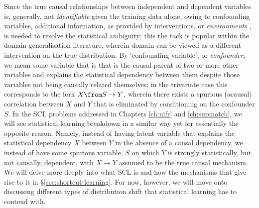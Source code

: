 Since the true causal relationships between independent and dependent variables is, generally, not
\emph{identifiable} given the training data alone, owing to confounding variables, additional
information, as provided by interventions, or \emph{environments} \citep{peters2016causal}, is
needed to resolve the statistical ambiguity; this  the tack is popular within the domain
generalisation literature, wherein domain can be viewed as a different intervention on the true
distribution.
%
By `confounding variable', or \emph{confounder}, we mean some variable that is that is the causal
parent of two or more other variables and explains the statistical dependency between them despite
those variables not being causally related themselves; in the trivariate case this corresponds to
the fork \(X \from S \to Y \), wherein there exists a spurious (acausal) correlation between \(X\)
and \(Y\) that is eliminated by conditioning on the confounder \(S\).
%
In the \ac{SCL} problems addressed in Chapters \ref{ch:nifr} and \ref{ch:supmatch}, we will see
statistical learning breakdown in a similar way yet for essentially the opposite reason.
%
Namely, instead of having latent variable that explains the statistical dependency \(X\) between
\(Y\) in the absence of a causal dependency, we instead of have some spurious variable, \(S\) on
which \(Y\) is strongly statistically, but not causally, dependent, with \(X \to Y \) assumed to be
the true causal mechanism.
%
We will delve more deeply into what \ac{SCL} is and how the mechanisms that give rise to it in
\S\ref{sec:shortcut-learning}.
%
For now, however, we will move onto discussing different types of distribution shift that
statistical learning has to contend with.



